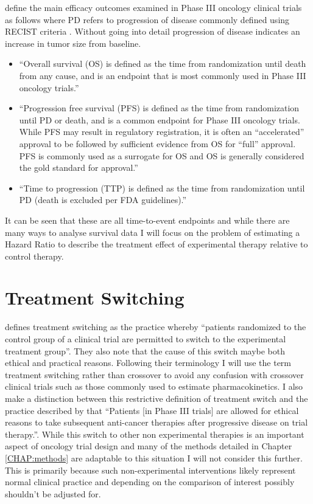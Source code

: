 \cite{DesignOnco2013} define the main efficacy outcomes examined in Phase III oncology clinical trials as follows where PD refers to progression of disease commonly defined using RECIST criteria \citep{RECIST11}. Without going into detail progression of disease indicates an increase in tumor size from baseline.

\begin{itemize}
\item ``Overall survival (OS) is defined as the time from randomization until death from any cause, and is an endpoint that is most commonly used in Phase III oncology trials.''
\item ``Progression free survival (PFS) is defined as the time from randomization until PD or death, and is a common endpoint for Phase III oncology trials. While PFS may result in regulatory registration, it is often an ``accelerated'' approval to be followed by sufficient evidence from OS for ``full'' approval. PFS is commonly used as a surrogate for OS and OS is generally considered the gold standard for approval.''
\item ``Time to progression (TTP) is defined as the time from randomization until PD (death is excluded per FDA guidelines).''
\end{itemize}

It can be seen that these are all time-to-event endpoints and while there are many ways to analyse survival data I will focus on the problem of estimating a Hazard Ratio to describe the treatment effect of experimental therapy relative to control therapy. 

\section{Treatment Switching}

\cite{Latimer2014} defines treatment switching as the practice whereby ``patients randomized to the control group of a clinical trial are permitted to switch to the experimental treatment group''. They also note that the cause of this switch maybe both ethical and practical reasons. Following their terminology I will use the term treatment switching rather than crossover to avoid any confusion with crossover clinical trials such as those commonly used to estimate pharmacokinetics. I also make a distinction between this restrictive definition of treatment switch and the practice described by \cite{DesignOnco2013} that ``Patients [in Phase III trials] are allowed for ethical reasons to take subsequent anti-cancer therapies after progressive disease on trial therapy.''. While this switch to other non experimental therapies is an important aspect of oncology trial design and many of the methods detailed in Chapter \ref{CHAP:methods} are adaptable to this situation I will not consider this further. This is primarily because such non-experimental interventions likely represent normal clinical practice and depending on the comparison of interest possibly shouldn't be adjusted for.

